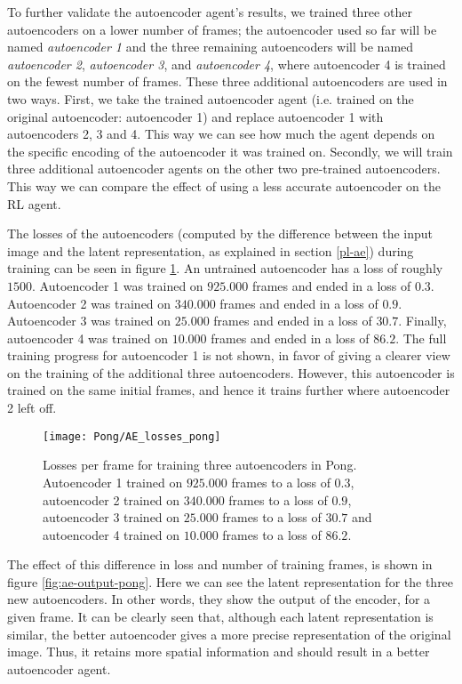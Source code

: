 To further validate the autoencoder agent's results, we trained three other autoencoders on a lower number of frames; the autoencoder used so far will be named \emph{autoencoder 1} and the three remaining autoencoders will be named \emph{autoencoder 2}, \emph{autoencoder 3}, and \emph{autoencoder 4}, where autoencoder 4 is trained on the fewest number of frames. These three additional autoencoders are used in two ways. First, we take the trained autoencoder agent (i.e. trained on the original autoencoder: autoencoder 1) and replace autoencoder 1 with autoencoders 2, 3 and 4. This way we can see how much the agent depends on the specific encoding of the autoencoder it was trained on. Secondly, we will train three additional autoencoder agents on the other two pre-trained autoencoders. This way we can compare the effect of using a less accurate autoencoder on the RL agent.

The losses of the autoencoders (computed by the difference between the input image and the latent representation, as explained in section \ref{pl-ae}) during training can be seen in figure \ref{fig:ae-loss-pong}. An untrained autoencoder has a loss of roughly $1500$. Autoencoder 1 was trained on $925.000$ frames and ended in a loss of $0.3$. Autoencoder 2 was trained on $340.000$ frames and ended in a loss of $0.9$. Autoencoder 3 was trained on $25.000$ frames and ended in a loss of $30.7$. Finally, autoencoder 4 was trained on $10.000$ frames and ended in a loss of $86.2$. The full training progress for autoencoder 1 is not shown, in favor of giving a clearer view on the training of the additional three autoencoders. However, this autoencoder is trained on the same initial frames, and hence it trains further where autoencoder 2 left off.

\begin{figure}[h]
    \centering
   	\texttt{[image: Pong/AE\_losses\_pong]}
    	\caption{Losses per frame for training three autoencoders in Pong. Autoencoder 1 trained on $925.000$ frames to a loss of $0.3$, autoencoder 2 trained on $340.000$ frames to a loss of $0.9$, autoencoder 3 trained on $25.000$ frames to a loss of $30.7$ and autoencoder 4 trained on $10.000$ frames to a loss of $86.2$.}
    	\label{fig:ae-loss-pong}
\end{figure}

The effect of this difference in loss and number of training frames, is shown in figure \ref{fig:ae-output-pong}. Here we can see the latent representation for the three new autoencoders. In other words, they show the output of the encoder, for a given frame. It can be clearly seen that, although each latent representation is similar, the better autoencoder gives a more precise representation of the original image. Thus, it retains more spatial information and should result in a better autoencoder agent.

